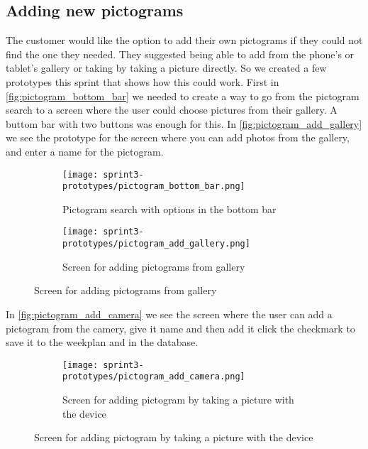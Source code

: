 \subsection{Adding new pictograms}
The customer would like the option to add their own pictograms if they could not find the one they needed. They suggested being able to add from the phone's or tablet's gallery or taking by taking a picture directly. So we created a few prototypes this sprint that shows how this could work. First in \autoref{fig:pictogram_bottom_bar} we needed to create a way to go from the pictogram search to a screen where the user could choose pictures from their gallery. A buttom bar with two buttons was enough for this. In \autoref{fig:pictogram_add_gallery} we see the prototype for the screen where you can add photos from the gallery, and enter a name for the pictogram.
\begin{figure}[H]
    \begin{subfigure}{0.5\textwidth}
    \texttt{[image: sprint3-prototypes/pictogram\_bottom\_bar.png]} 
    \caption{Pictogram search with options in the bottom bar}
    \label{fig:pictogram_bottom_bar}
    \end{subfigure}
    \begin{subfigure}{0.5\textwidth}
        \texttt{[image: sprint3-prototypes/pictogram\_add\_gallery.png]}
    \caption{Screen for adding pictograms from gallery}
    \label{fig:pictogram_add_gallery}
    \end{subfigure} 
\end{figure}
In \autoref{fig:pictogram_add_camera} we see the screen where the user can add a pictogram from the camery, give it name and then add it click the checkmark to save it to the weekplan and in the database.
\begin{figure}[H]
    \begin{subfigure}{0.5\textwidth}
    \texttt{[image: sprint3-prototypes/pictogram\_add\_camera.png]} 
    \caption{Screen for adding pictogram by taking a picture with the device}
    \label{fig:pictogram_add_camera}
    \end{subfigure}
\end{figure}
